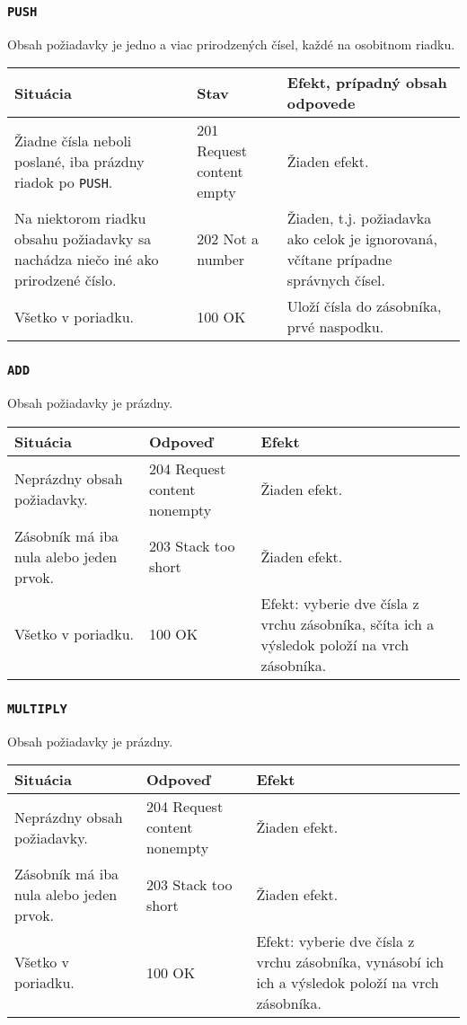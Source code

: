 \documentclass[11pt]{article}
\theoremstyle{definition}
\begin{document}
\subsubsection{\tt PUSH}
Obsah požiadavky je jedno a viac prirodzených čísel, každé na osobitnom riadku.
\begin{longtable}{|p{12em}|p{12em}|p{15em}|}
\hline
	\textbf{Situácia}
	&
	\textbf{Stav}
	& 
	\textbf{Efekt, prípadný obsah odpovede}\\
\endhead
\hline
	Žiadne čísla neboli poslané, iba prázdny riadok po {\tt PUSH}.
	&	
	201 Request content empty
	&
	Žiaden efekt.\\
\hline
	Na niektorom riadku obsahu požiadavky sa nachádza niečo iné ako prirodzené číslo.
	&	
	202 Not a number
	&
	Žiaden, t.j. požiadavka ako celok je ignorovaná, včítane prípadne správnych čísel.\\
\hline
	Všetko v poriadku. 
	&
	100 OK
	&
	Uloží čísla do zásobníka, prvé naspodku.\\
\hline
\end{longtable}
\subsubsection{\tt ADD}
Obsah požiadavky je prázdny.
\begin{longtable}{|p{12em}|p{12em}|p{15em}|}
\hline
	\textbf{Situácia}
	&
	\textbf{Odpoveď}
	& 
	\textbf{Efekt}\\
\endhead
\hline
	Neprázdny obsah požiadavky.
	&	
	204 Request content nonempty
	&
	Žiaden efekt.\\
\hline
	Zásobník má iba nula alebo jeden prvok.
	&	
	203 Stack too short
	&
	Žiaden efekt.\\
\hline
	Všetko v poriadku. 
	&
	100 OK
	&
	Efekt: vyberie dve čísla z vrchu zásobníka, sčíta ich a výsledok položí na vrch zásobníka.\\
\hline
\end{longtable}
\subsubsection{\tt MULTIPLY}
Obsah požiadavky je prázdny.
\begin{longtable}{|p{12em}|p{12em}|p{15em}|}
\hline
	\textbf{Situácia}
	&
	\textbf{Odpoveď}
	& 
	\textbf{Efekt}\\
\endhead
\hline
	Neprázdny obsah požiadavky.
	&	
	204 Request content nonempty
	&
	Žiaden efekt.\\
\hline
	Zásobník má iba nula alebo jeden prvok.
	&	
	203 Stack too short
	&
	Žiaden efekt.\\
\hline
	Všetko v poriadku. 
	&
	100 OK
	&
	Efekt: vyberie dve čísla z vrchu zásobníka, vynásobí ich ich a výsledok položí na vrch zásobníka.\\
\hline
\end{longtable}
\newpage
\end{document}
